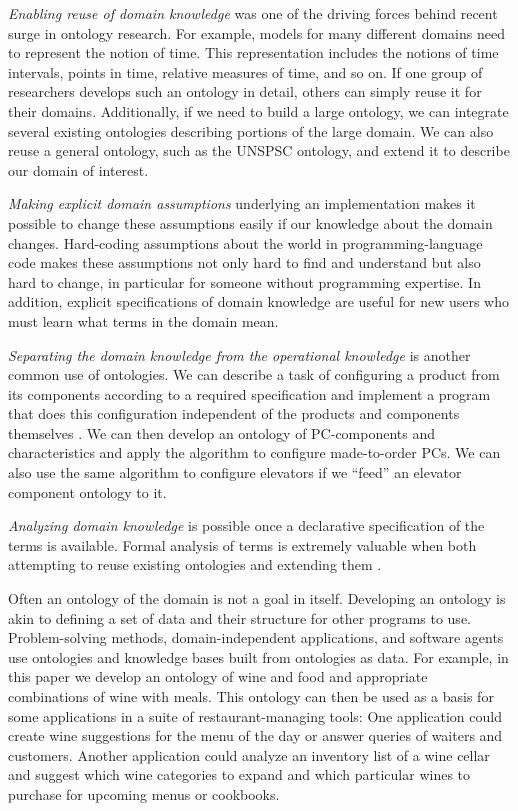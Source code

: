 \documentclass[preprint,12pt]{elsarticle}
\begin{document}
\emph{Enabling reuse of domain knowledge} was one of the driving forces behind recent surge in ontology research. For example, models for many different domains need to represent the notion of time. This representation includes the notions of time intervals, points in time, relative measures of time, and so on. If one group of researchers develops such an ontology in detail, others can simply reuse it for their domains. Additionally, if we need to build a large ontology, we can integrate several existing ontologies describing portions of the large domain. We can also reuse a general ontology, such as the UNSPSC ontology, and extend it to describe our domain of interest.

\emph{Making explicit domain assumptions} underlying an implementation makes it possible to change these assumptions easily if our knowledge about the domain changes. Hard-coding assumptions about the world in programming-language code makes these assumptions not only hard to find and understand but also hard to change, in particular for someone without programming expertise. In addition, explicit specifications of domain knowledge are useful for new users who must learn what terms in the domain mean. 

\emph{Separating the domain knowledge from the operational knowledge} is another common use of ontologies. We can describe a task of configuring a product from its components according to a required specification and implement a program that does this configuration independent of the products and components themselves \cite{mcguinness1998usability}. We can then develop an ontology of PC-components and characteristics and apply the algorithm to configure made-to-order PCs. We can also use the same algorithm to configure elevators if we “feed” an elevator component ontology to it.

\emph{Analyzing domain knowledge} is possible once a declarative specification of the terms is available.  Formal analysis of terms is extremely valuable when both attempting to reuse existing ontologies and extending them \cite{mcguinness2000chimaera}.

Often an ontology of the domain is not a goal in itself. Developing an ontology is akin to defining a set of data and their structure for other programs to use. Problem-solving methods, domain-independent applications, and software agents use ontologies and knowledge bases built from ontologies as data. For example, in this paper we develop an ontology of wine and food and appropriate combinations of wine with meals. This ontology can then be used as a basis for some applications in a suite of restaurant-managing tools: One application could create wine suggestions for the menu of the day or answer queries of waiters and customers. Another application could analyze an inventory list of a wine cellar and suggest which wine categories to expand and which particular wines to purchase for upcoming menus or cookbooks.
\end{document}
